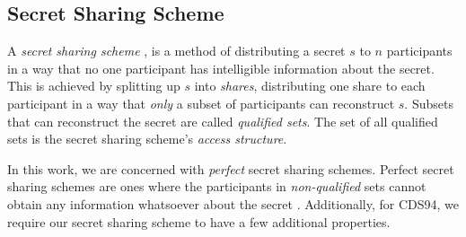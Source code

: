 \subsection{Secret Sharing Scheme}
A \textit{secret sharing scheme} \cite{DBLP:journals/cacm/Shamir79, DBLP:conf/mark2/Blakley79}, is a method of 
distributing a secret $s$ to $n$ participants in a way that no one participant has intelligible information about 
the secret. This is achieved by splitting up $s$ into \textit{shares}, distributing one share to each participant in 
a way that \textit{only} a subset of participants can reconstruct $s$. Subsets that can reconstruct the secret are 
called \textit{qualified sets}. The set of all qualified sets is the secret sharing scheme's \textit{access structure}.

In this work, we are concerned with \textit{perfect} secret sharing schemes. 
Perfect secret sharing schemes are ones where the participants in \textit{non-qualified} sets cannot obtain any information 
whatsoever about the secret \cite{CDS94}. Additionally, for CDS94, we require our secret sharing scheme to have a few 
additional properties. 


